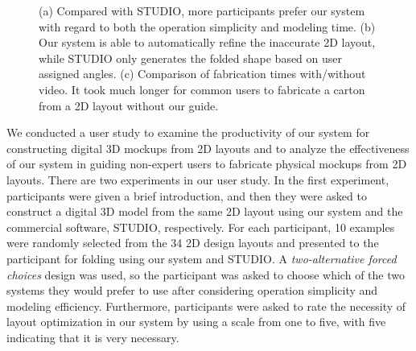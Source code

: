 
 
 \begin{figure}  
 	\centering
 	\vspace{2ex}
 	\vspace{2ex}
 	\caption{(a) Compared with STUDIO, more participants prefer our system with regard to both the operation simplicity and modeling time. (b) Our system is able to automatically refine the inaccurate 2D layout, while STUDIO only generates the folded shape based on user assigned angles. (c) Comparison of fabrication times with/without video. It took much longer for common users to fabricate a carton from a 2D layout without our guide.}
 	\label{fig:userstudy}
 \end{figure}
 
 
 
We conducted a user study to examine the productivity of our system for constructing digital 3D mockups from 2D layouts and to analyze the effectiveness of our system in guiding non-expert users to fabricate physical mockups from 2D layouts. 
%
There are two experiments in our user study.
% 
In the first experiment, participants were given a brief introduction, and then they were asked to construct a digital 3D model from the same 2D layout using our system and the commercial software, STUDIO, respectively.
For each participant, 10 examples were randomly selected from the 34 2D design layouts and presented to the participant for folding using our system and STUDIO.
A \emph{two-alternative forced choices} design was used, so the participant was asked to choose which of the two systems they would prefer to use after considering operation simplicity and modeling efficiency. 
%
Furthermore, participants were asked to rate the necessity of layout optimization in our system by using a scale from one to five, with five indicating that it is very necessary.

